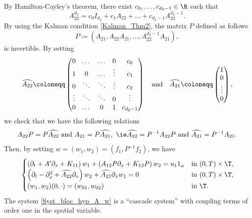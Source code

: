 By Hamilton-Cayley's theorem, there exist $c_0, \dots, c_{d_2-1} \in \R$ such that
\[
A_{22}^{d_2} = c_0 I_{d_2} + c_1 A_{22} + \dots + c_{d_2-1} A_{22}^{d_2-1}.
\]
By using the Kalman condition \eqref{Kalman_Thm2}, the matrix $P$ defined as follows
\[
P \coloneqq (A_{21}, A_{22} A_{21}, \dots, A_{22}^{d_2-1} A_{21}),
\]
is invertible. By setting
\begin{equation}
\label{eq:cascade}\arraycolsep4.5pt
\widehat{A_{22}} \coloneqq \begin{pmatrix} 0 & \dots & \dots & 0 & c_0\\
1 & 0 &\dots & \vdots & c_1\\
0 & \ddots & \ddots & \vdots & c_2\\
\vdots & \ddots & \ddots & 0 & \vdots\\
0 & \dots &0 & 1 & c_{d_2-1}
\end{pmatrix}\quad \text{and}\quad \widehat{A_{21}} \coloneqq \begin{pmatrix} 1\\0\\ \vdots\\ 0 \end{pmatrix},
\end{equation}
we check that we have the following relations
\[
A_{22}P = P \widehat{A_{22}}\ \text{and}\ A_{21} = P \widehat{A_{21}},\ \text{\ie} \widehat{A_{22}} = P^{-1} A_{22} P\ \text{and}\ \widehat{A_{21}} = P^{-1} A_{21}.
\]
Then, by setting $w =(w_1,w_2) = (f_1,P^{-1}f_2)$, we have
\begin{equation} \label{Syst_bloc_hyp_A_w}
\begin{cases}
\left(\partial_t +A'\partial_x+K_{11}\right)w_1+\left(A_{12}P\partial_x+K_{12}P\right)w_2= u_1 1_\omega
&\text{in}\ (0,T)\times \T,\!\\
\left(\partial_t - \partial_x^2+\widehat{A_{22}}\partial_x\right)w_2 + \widehat{A_{21}}\partial_x w_1 = 0 &\text{in}\ (0,T)\times \T,\!\\
(w_1,w_2)(0,\cdot)=(w_{01},w_{02}) & \text{in}\ \T.
\end{cases}
\end{equation}
The system \eqref{Syst_bloc_hyp_A_w} is a “cascade system” with coupling terms of order one in the spatial variable.

